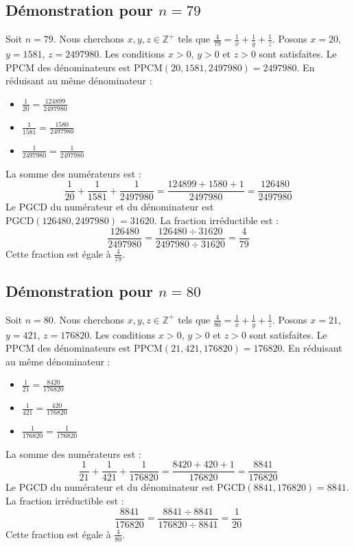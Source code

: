 \documentclass[11pt,a4paper]{article}
\begin{document}
\subsection{Démonstration pour $n = 79$}
Soit $n = 79$. Nous cherchons $x, y, z \in \mathbb{Z}^{+}$ tels que $\frac{4}{79} = \frac{1}{x} + \frac{1}{y} + \frac{1}{z}$.
Posons $x = 20$, $y = 1581$, $z = 2497980$.
Les conditions $x > 0$, $y > 0$ et $z > 0$ sont satisfaites.
Le PPCM des dénominateurs est $\text{PPCM}(20, 1581, 2497980) = 2497980$.
En réduisant au même dénominateur :
\begin{itemize}
    \item $\frac{1}{20} = \frac{124899}{2497980}$
    \item $\frac{1}{1581} = \frac{1580}{2497980}$
    \item $\frac{1}{2497980} = \frac{1}{2497980}$
\end{itemize}
La somme des numérateurs est :
$$ \frac{1}{20} + \frac{1}{1581} + \frac{1}{2497980} = \frac{124899 + 1580 + 1}{2497980} = \frac{126480}{2497980} $$
Le PGCD du numérateur et du dénominateur est $\text{PGCD}(126480, 2497980) = 31620$.
La fraction irréductible est :
$$ \frac{126480}{2497980} = \frac{126480 \div 31620}{2497980 \div 31620} = \frac{4}{79} $$
Cette fraction est égale à $\frac{4}{79}$.

\subsection{Démonstration pour $n = 80$}
Soit $n = 80$. Nous cherchons $x, y, z \in \mathbb{Z}^{+}$ tels que $\frac{4}{80} = \frac{1}{x} + \frac{1}{y} + \frac{1}{z}$.
Posons $x = 21$, $y = 421$, $z = 176820$.
Les conditions $x > 0$, $y > 0$ et $z > 0$ sont satisfaites.
Le PPCM des dénominateurs est $\text{PPCM}(21, 421, 176820) = 176820$.
En réduisant au même dénominateur :
\begin{itemize}
    \item $\frac{1}{21} = \frac{8420}{176820}$
    \item $\frac{1}{421} = \frac{420}{176820}$
    \item $\frac{1}{176820} = \frac{1}{176820}$
\end{itemize}
La somme des numérateurs est :
$$ \frac{1}{21} + \frac{1}{421} + \frac{1}{176820} = \frac{8420 + 420 + 1}{176820} = \frac{8841}{176820} $$
Le PGCD du numérateur et du dénominateur est $\text{PGCD}(8841, 176820) = 8841$.
La fraction irréductible est :
$$ \frac{8841}{176820} = \frac{8841 \div 8841}{176820 \div 8841} = \frac{1}{20} $$
Cette fraction est égale à $\frac{4}{80}$.
\end{document}
